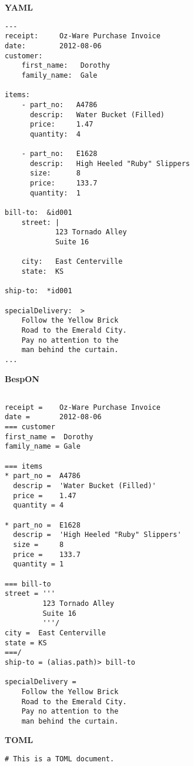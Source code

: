 \documentclass[11pt]{article}
\begin{document}
{{\begin{appendices}
\begin{tcolorbox}{}
\begin{multicols}{2}
\centering \textbf{YAML}
\begin{Verbatim}[formatcom=\color{DarkGreen}]
---
receipt:     Oz-Ware Purchase Invoice
date:        2012-08-06
customer:
    first_name:   Dorothy
    family_name:  Gale

items:
    - part_no:   A4786
      descrip:   Water Bucket (Filled)
      price:     1.47
      quantity:  4

    - part_no:   E1628
      descrip:   High Heeled "Ruby" Slippers
      size:      8
      price:     133.7
      quantity:  1

bill-to:  &id001
    street: |
            123 Tornado Alley
            Suite 16
    
    city:   East Centerville
    state:  KS

ship-to:  *id001

specialDelivery:  >
    Follow the Yellow Brick
    Road to the Emerald City.
    Pay no attention to the
    man behind the curtain.
...
\end{Verbatim}
\columnbreak
\centering \textbf{BespON}

\begin{Verbatim}

receipt =    Oz-Ware Purchase Invoice
date =       2012-08-06
=== customer
first_name =  Dorothy
family_name = Gale

=== items
* part_no =  A4786
  descrip =  'Water Bucket (Filled)'
  price =    1.47
  quantity = 4

* part_no =  E1628
  descrip =  'High Heeled "Ruby" Slippers'
  size =     8
  price =    133.7
  quantity = 1

=== bill-to
street = '''
         123 Tornado Alley
         Suite 16
         '''/
city =  East Centerville
state = KS
===/
ship-to = (alias.path)> bill-to

specialDelivery =
    Follow the Yellow Brick
    Road to the Emerald City.
    Pay no attention to the
    man behind the curtain.

\end{Verbatim}
\end{multicols}
\end{tcolorbox}



\begin{tcolorbox}{}
\begin{multicols}{2}

\centering \textbf{TOML}
\begin{Verbatim}[formatcom=\color{DarkGreen}]
# This is a TOML document.


\end{Verbatim}
\end{multicols}
\end{tcolorbox}
\end{appendices}}}
\end{document}
